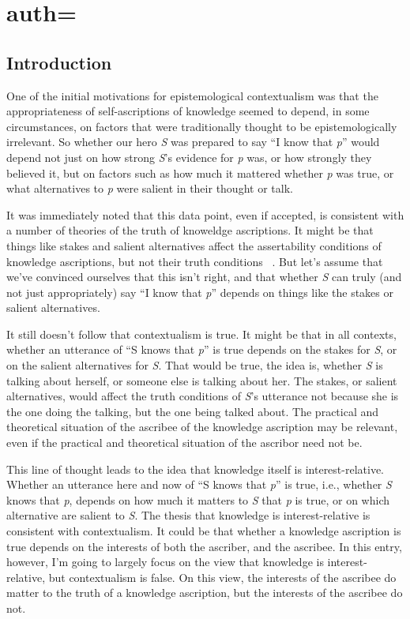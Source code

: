 \documentclass[11pt,oneside]{book}
\begin{document}
\chapter[\shorttitle]{\mytitle{} auth=\myauthor}

\section{Introduction}
\label{introduction}

One of the initial motivations for epistemological contextualism was that the appropriateness of self-ascriptions of knowledge seemed to depend, in some circumstances, on factors that were traditionally thought to be epistemologically irrelevant. So whether our hero \emph{S} was prepared to say ``I know that \emph{p}'' would depend not just on how strong \emph{S}'s evidence for \emph{p} was, or how strongly they believed it, but on factors such as how much it mattered whether \emph{p} was true, or what alternatives to \emph{p} were salient in their thought or talk.

It was immediately noted that this data point, even if accepted, is consistent with a number of theories of the truth of knoweldge ascriptions. It might be that things like stakes and salient alternatives affect the assertability conditions of knowledge ascriptions, but not their truth conditions ~\citep{Rysiew2016}. But let's assume that we've convinced ourselves that this isn't right, and that whether \emph{S} can truly (and not just appropriately) say ``I know that \emph{p}'' depends on things like the stakes or salient alternatives.

It still doesn't follow that contextualism is true. It might be that in all contexts, whether an utterance of ``S knows that \emph{p}'' is true depends on the stakes for \emph{S}, or on the salient alternatives for \emph{S}. That would be true, the idea is, whether \emph{S} is talking about herself, or someone else is talking about her. The stakes, or salient alternatives, would affect the truth conditions of \emph{S}'s utterance not because she is the one doing the talking, but the one being talked about. The practical and theoretical situation of the ascribee of the knowledge ascription may be relevant, even if the practical and theoretical situation of the ascribor need not be.

This line of thought leads to the idea that knowledge itself is interest-relative. Whether an utterance here and now of ``S knows that \emph{p}'' is true, i.e., whether \emph{S} knows that \emph{p}, depends on how much it matters to \emph{S} that \emph{p} is true, or on which alternative are salient to \emph{S}. The thesis that knowledge is interest-relative is consistent with contextualism. It could be that whether a knowledge ascription is true depends on the interests of both the ascriber, and the ascribee. In this entry, however, I'm going to largely focus on the view that knowledge is interest-relative, but contextualism is false. On this view, the interests of the ascribee do matter to the truth of a knowledge ascription, but the interests of the ascribee do not.
\end{document}
